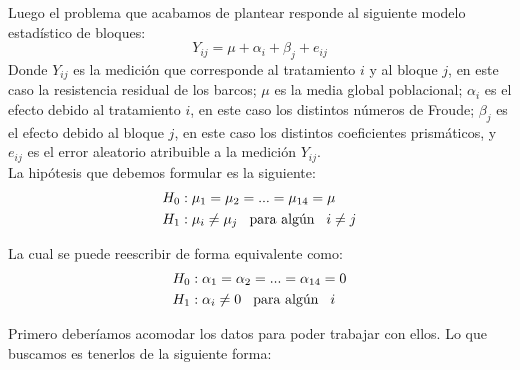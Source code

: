 \documentclass[twoside]{article}
\begin{document}
\begin{multicols}{2}
Luego el problema que acabamos de plantear responde al siguiente modelo estad\'istico de bloques: 
$$Y_{ij} = \mu + \alpha_i + \beta_j + e_{ij}$$ 
Donde $Y_{ij}$ es la medici\'on que corresponde al tratamiento $i$ y al bloque $j$, en este caso la resistencia residual de los barcos; $\mu$ es la media global poblacional; $\alpha_i$ es el efecto debido al tratamiento $i$, en este caso los distintos n\'umeros de Froude; $\beta_j$ es el efecto debido al bloque $j$, en este caso los distintos coeficientes prism\'aticos, y $e_{ij}$ es el error aleatorio atribuible a la medici\'on $Y_{ij}$.\\

La hip\'otesis que debemos formular es la siguiente:
\begin{align*}
H_0 &: \mu_1 = \mu_2 = ... = \mu_{14} = \mu \\
H_1 &: \mu_i \neq \mu_j \hspace{0.3cm} \text{para alg\'un} \hspace{0.3cm} i \neq j
\end{align*}

La cual se puede reescribir de forma equivalente como:
\begin{align*}
H_0 &: \alpha_1 = \alpha_2 = ... = \alpha_{14} = 0 \\
H_1 &: \alpha_i \neq 0 \hspace{0.3cm} \text{para alg\'un} \hspace{0.3cm} i 
\end{align*}

Primero deber\'iamos acomodar los datos para poder trabajar con ellos. Lo que buscamos es tenerlos de la siguiente forma:\\

 \\\\


\end{multicols}
\end{document}
